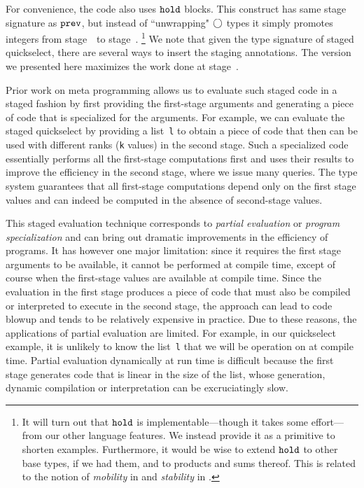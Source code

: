 For convenience, the code also uses ${\tt hold}$ blocks.  This construct
has same stage signature as ${\tt prev}$, but instead of ``unwrapping"
$\bigcirc$ types it simply promotes integers from stage~\bbone\ to
stage~\bbtwo.
\footnote{It will turn out that ${\tt hold}$ is implementable---though it
  takes some effort---from our other language features.  We instead
  provide it as a primitive to shorten examples.  Furthermore, it
  would be wise to extend ${\tt hold}$ to other base types, if we had
  them, and to products and sums thereof.  This is related to the
  notion of {\em mobility} in \cite{murphy05} and {\em stability} in
  \cite{krishnaswami13}.} We note that given the type signature of
staged quickselect, there are several ways to insert the staging
annotations.  The version we presented here maximizes the work done at
stage~\bbone.









Prior work on meta programming allows us to evaluate such staged code
in a staged fashion by first providing the first-stage arguments and
generating a piece of code that is specialized for the arguments.  For
example, we can evaluate the staged quickselect by providing a
list~\texttt{l} to obtain a piece of code that then can be used with
different ranks (\texttt{k} values) in the second stage.  Such a
specialized code essentially performs all the first-stage computations
first and uses their results to improve the efficiency in the second
stage, where we issue many queries.  The type system guarantees that
all first-stage computations depend only on the first stage values and
can indeed be computed in the absence of second-stage values.  

This staged evaluation technique corresponds to {\em partial
  evaluation} or {\em program specialization} and can bring out
dramatic improvements in the efficiency of programs.  It has however
one major limitation: since it requires the first stage arguments to
be available, it cannot be performed at compile time, except of course
when the first-stage values are available at compile time.  Since the
evaluation in the first stage produces a piece of code that must also
be compiled or interpreted to execute in the second stage, the
approach can lead to code blowup and tends to be relatively expensive
in practice.  Due to these reasons, the applications of partial
evaluation are limited.  For example, in our quickselect example, it
is unlikely to know the list~\texttt{l} that we will be operation on
at compile time. Partial evaluation dynamically at run time is
difficult because the first stage generates code that is linear in the
size of the list, whose generation, dynamic compilation or
interpretation can be excruciatingly slow.

